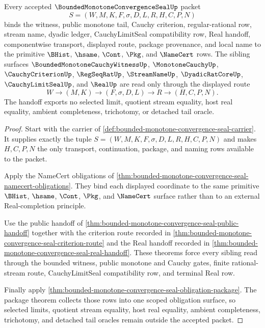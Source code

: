 \begin{theorem}
\label{thm:bounded-monotone-convergence-seal-scoped-handoff-package}
Every accepted $\BoundedMonotoneConvergenceSealUp$ packet
$$
S=(W,M,K,F,\sigma,D,L,R,H,C,P,N)
$$
binds the witness, public monotone tail, Cauchy criterion, regular-rational row, stream name, dyadic ledger, CauchyLimitSeal compatibility row, Real handoff, componentwise transport, displayed route, package provenance, and local name to the primitive $\BHist$, $\hsame$, $\Cont$, $\Pkg$, and $\NameCert$ rows. The sibling surfaces $\BoundedMonotoneCauchyWitnessUp$, $\MonotoneCauchyUp$, $\CauchyCriterionUp$, $\RegSeqRatUp$, $\StreamNameUp$, $\DyadicRatCoreUp$, $\CauchyLimitSealUp$, and $\RealUp$ are read only through the displayed route
$$
W \to (M,K) \to (F,\sigma,D,L) \to R \to (H,C,P,N).
$$
The handoff exports no selected limit, quotient stream equality, host real equality, ambient completeness, trichotomy, or detached tail oracle.
\end{theorem}
\begin{proof}
Start with the carrier of \autoref{def:bounded-monotone-convergence-seal-carrier}. It supplies exactly the tuple $S=(W,M,K,F,\sigma,D,L,R,H,C,P,N)$ and makes $H,C,P,N$ the only transport, continuation, package, and naming rows available to the packet.

Apply the NameCert obligations of \autoref{thm:bounded-monotone-convergence-seal-namecert-obligations}. They bind each displayed coordinate to the same primitive $\BHist$, $\hsame$, $\Cont$, $\Pkg$, and $\NameCert$ surface rather than to an external Real-completion principle.

Use the public handoff of \autoref{thm:bounded-monotone-convergence-seal-public-handoff} together with the criterion route recorded in \autoref{thm:bounded-monotone-convergence-seal-criterion-route} and the Real handoff recorded in \autoref{thm:bounded-monotone-convergence-seal-real-handoff}. These theorems force every sibling read through the bounded witness, public monotone and Cauchy gates, finite rational-stream route, CauchyLimitSeal compatibility row, and terminal Real row.

Finally apply \autoref{thm:bounded-monotone-convergence-seal-obligation-package}. The package theorem collects those rows into one scoped obligation surface, so selected limits, quotient stream equality, host real equality, ambient completeness, trichotomy, and detached tail oracles remain outside the accepted packet.
\end{proof}

